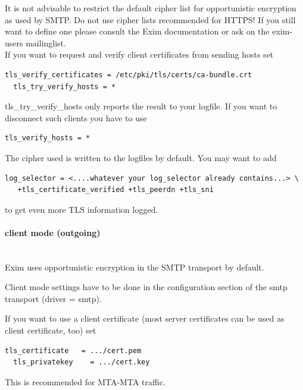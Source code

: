 It is not advisable to restrict the default cipher list for opportunistic encryption as used by SMTP. Do not use cipher lists recommended for HTTPS! If you still want to define one please consult the Exim documentation or ask on the exim-users mailinglist.\\

If you want to request and verify client certificates from sending hosts set
\begin{lstlisting}[breaklines]
  tls_verify_certificates = /etc/pki/tls/certs/ca-bundle.crt
  tls_try_verify_hosts = *
\end{lstlisting}

tls\_try\_verify\_hosts only reports the result to your logfile. If you want to disconnect such clients you have to use
\begin{lstlisting}[breaklines]
  tls_verify_hosts = *
\end{lstlisting}

The cipher used is written to the logfiles by default. You may want to add
\begin{lstlisting}[breaklines]
  log_selector = <....whatever your log_selector already contains...> \
   +tls_certificate_verified +tls_peerdn +tls_sni
\end{lstlisting}
to get even more TLS information logged.

\paragraph*{client mode (outgoing)}\mbox{}\\

Exim uses opportunistic encryption in the SMTP transport by default.

Client mode settings have to be done in the configuration section of the smtp transport (driver = smtp).

If you want to use a client certificate (most server certificates can be used as client certificate, too) set
\begin{lstlisting}[breaklines]
  tls_certificate   = .../cert.pem
  tls_privatekey    = .../cert.key
\end{lstlisting}
This is recommended for MTA-MTA traffic.\\

